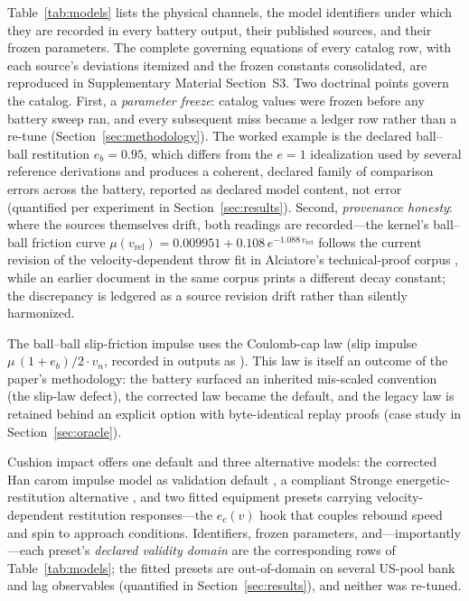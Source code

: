 Table~\ref{tab:models} lists the physical channels, the model identifiers
under which they are recorded in every battery output, their published
sources, and their frozen parameters. The complete governing equations of
every catalog row, with each source's deviations itemized and the frozen
constants consolidated, are reproduced in Supplementary Material
Section~S3. Two doctrinal points govern the
catalog. First, a \emph{parameter freeze}: catalog values were frozen
before any battery sweep ran, and every subsequent miss became a ledger row
rather than a re-tune (Section~\ref{sec:methodology}). The worked example
is the declared ball--ball restitution $e_b = 0.95$, which differs from the
$e = 1$ idealization used by several reference derivations and produces a
coherent, declared family of comparison errors across the battery,
reported as declared model content, not error (quantified per experiment in
Section~\ref{sec:results}). Second, \emph{provenance honesty}: where the
sources themselves drift, both readings are recorded---the kernel's
ball--ball friction curve $\mu(v_{\mathrm{rel}}) = 0.009951 + 0.108\,
e^{-1.088\,v_{\mathrm{rel}}}$ follows the current revision of the
velocity-dependent throw fit in Alciatore's technical-proof corpus
\citep{alciatore_tp_a14}, while an earlier document in the same corpus
prints a different decay constant; the discrepancy is ledgered as a
source revision drift rather than silently harmonized.

The ball--ball slip-friction impulse uses the Coulomb-cap law (slip
impulse $\mu\,(1+e_b)/2\cdot v_n$, recorded in outputs as
). This law is itself an outcome of the paper's
methodology: the battery surfaced an inherited mis-scaled convention
(the slip-law defect), the corrected law became the default, and the
legacy law is
retained behind an explicit option with byte-identical replay proofs
(case study in Section~\ref{sec:oracle}).

Cushion impact offers one default and three alternative models: the
corrected Han carom impulse model as validation default
\citep{han2005dynamics}, a compliant Stronge energetic-restitution
alternative \citep{stronge2018impact}, and two fitted equipment presets
carrying velocity-dependent restitution responses---the $e_c(v)$ hook
that couples rebound speed and spin to approach conditions.
Identifiers, frozen parameters, and---importantly---each preset's
\emph{declared validity domain} are the corresponding rows of
Table~\ref{tab:models}; the fitted presets are out-of-domain on several
US-pool bank and lag observables (quantified in
Section~\ref{sec:results}), and
neither was re-tuned.

